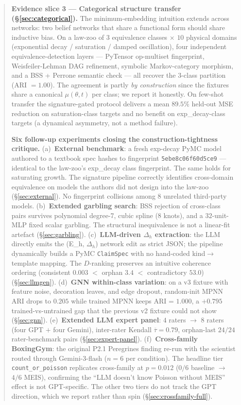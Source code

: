 \documentclass{article}
\begin{document}
\begin{abstract}
\textbf{Evidence slice 3 --- Categorical structure transfer
(\S\ref{sec:categorical}).} The minimum-embedding intuition
extends across networks: two belief networks that share a
functional form should share inductive bias. On a law-zoo of
$3$ equivalence classes $\times$ $10$ physical domains (exponential
decay / saturation / damped oscillation), four independent
equivalence-detection layers --- PyTensor op-multiset fingerprint,
Weisfeiler-Lehman DAG refinement, symbolic Markov-category
morphism, and a BSS + Perrone semantic check --- all recover the
$3$-class partition (ARI $= 1.00$). The agreement is partly
\emph{by construction} since the fixtures share a canonical
$\mu(\theta, t)$ per class; we report it honestly. On few-shot
transfer the signature-gated protocol delivers a mean $89.5\%$
held-out MSE reduction on saturation-class targets and no benefit
on exp\_decay-class targets (a dynamical asymmetry, not a method
failure).

\textbf{Six follow-up experiments closing the construction-tightness
critique.}
(a)~\textbf{External benchmark}: a fresh exp-decay PyMC model
authored to a textbook spec hashes to fingerprint
\texttt{5ebe8c06f60d5ce9} --- identical to the law-zoo's exp\_decay
class fingerprint. The same holds for saturating growth. The
signature pipeline correctly identifies cross-domain equivalence on
models the authors did not design into the law-zoo
(\S\ref{sec:external}). No fingerprint collisions among $8$ unrelated
third-party models.
(b)~\textbf{Extended garbling search}: BSS rejection of cross-class
pairs survives polynomial degree-7, cubic spline (8 knots), and a
$32$-unit-MLP fixed scalar garbling. The structural inequivalence is
not a linear-fit artefact (\S\ref{sec:garbling}).
(c)~\textbf{LLM-driven $\Delta_{h}$ extraction}: the LLM directly
emits the (E_h, $\Delta_{h}$) network edit as strict JSON; the
pipeline dynamically builds a PyMC \texttt{ClaimSpec} with no
hand-coded kind$\to$template mapping. The $D$-ranking preserves an
intuitive coherence ordering (consistent $0.003$ $<$ orphan $3.4$
$<$ contradictory $53.0$) (\S\ref{sec:llmgen}).
(d)~\textbf{GNN within-class variation}: on a v3 fixture with feature
noise, decoration leaves, and edge dropout, random-init MPNN ARI
drops to $0.205$ while trained MPNN keeps ARI = $1.000$, a
$+0.795$ trained-vs-untrained gap that the previous v2 fixture could
not show (\S\ref{sec:gnn}).
(e)~\textbf{Extended LLM expert panel}: $4$ raters $\to$ $8$ raters
(four GPT $+$ four Gemini), inter-rater Kendall $\overline{\tau} =
0.79$, orphan-last $24/24$ rater-benchmark pairs (\S\ref{sec:expert-panel}).
(f)~\textbf{Cross-family BoxingGym}: the original P2.1 Peregrines
finding re-run with the scientist routed through Gemini-3-flash
($n = 6$ per condition). The headline tier
\texttt{count\_or\_poisson} replicates cross-family at
$p = 0.012$ ($0/6$ baseline $\to$ $4/6$ MEIS), confirming the
``LLM doesn't know Poisson without MEIS'' effect is not
GPT-specific. The other two tiers do not track the GPT direction,
which we report rather than spin (\S\ref{sec:crossfamily-full}).


\end{abstract}
\end{document}
